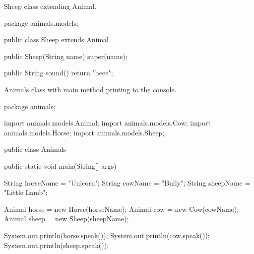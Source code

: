 \begin{program}[hbt!]
    \caption{ Sheep class extending Animal. }
    \label{appendix:sheep}
    \begin{JavaCode}
package animals.models;

public class Sheep extends Animal {

	public Sheep(String name) {
		super(name);
	}
	
	public String sound() {
		return "beee";
	}
}  \end{JavaCode}
\end{program}

\begin{program}[hbt!]
    \caption{ Animals class with main method printing to the console. }
    \label{appendix:animals}
    \begin{JavaCode}
package animals;

import animals.models.Animal;
import animals.models.Cow;
import animals.models.Horse;
import animals.models.Sheep;

public class Animals {

	public static void main(String[] args) {
		String horseName = "Unicorn";
		String cowName = "Bully";
		String sheepName = "Little Lamb";
		
		Animal horse = new Horse(horseName);
		Animal cow = new Cow(cowName);
		Animal sheep = new Sheep(sheepName);
		
		System.out.println(horse.speak());
		System.out.println(cow.speak());
		System.out.println(sheep.speak());
	}

} \end{JavaCode}
\end{program}

